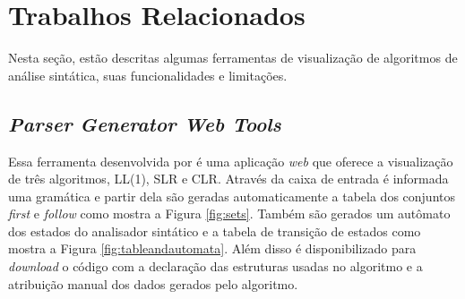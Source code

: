 \chapter{Trabalhos Relacionados}
\label{cap:trabalhos-relacionados}

Nesta seção, estão descritas algumas ferramentas de visualização de algoritmos de análise sintática, suas funcionalidades e limitações.

\section{\textit{Parser Generator Web Tools}}
\label{sec:trabalho-relacionado-a}

Essa ferramenta desenvolvida por \textcite{Parser-2024-04-12} é uma aplicação \textit{web} que oferece a visualização de três algoritmos, LL(1), SLR e CLR. Através da caixa de entrada é informada uma gramática e partir dela são geradas automaticamente a tabela dos conjuntos \textit{first} e \textit{follow} como mostra a Figura \ref{fig:sets}. Também são gerados um autômato dos estados do analisador sintático e a tabela de transição de estados como mostra a Figura \ref{fig:tableandautomata}. Além disso é disponibilizado para \textit{download} o código com a declaração das estruturas usadas no algoritmo e a atribuição manual dos dados gerados pelo algoritmo.
\begin{figure}[htp]
    \captionsetup{width=16cm}
\end{figure}
